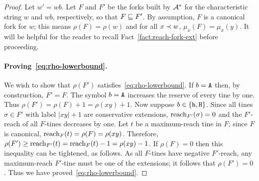 \begin{proof}  
  Let $w' = wb$.
  Let $F$ and $F'$ be the forks built by $\mathcal{A}^*$ 
  for the characteristic string $w$ and $wb$, respectively, 
  so that $F \sqsubseteq F'$.
  By assumption, $F$ is a canonical fork for $w$; 
  this means $\rho(F) = \rho(w)$ and
  for all $x \prec w$, $\mu_x(F) = \mu_x(y)$. 
  It will be helpful for the reader to recall Fact~\ref{fact:reach-fork-ext} before proceeding.


  \paragraph{Proving~\eqref{eq:rho-lowerbound}.} 
  We wish to show that 
  $\rho(F')$ satisfies~\eqref{eq:rho-lowerbound}. 
  If $b = \mathtt{A}$ then, by construction,
  $F' = F$. 
  The symbol $b = \mathtt{A}$ increases the reserve 
  of every tine by one. 
  Thus  
  $
  \rho(F') 
  = \rho(F) + 1
  = \rho(xy)  + 1
  $. 
  Now suppose $b \in \{\mathtt{h}, \mathtt{H}\}$. 
  Since all tines $\sigma \in F'$ with label $|xy| + 1$ 
  are conservative extensions, $\operatorname{reach}_{F'}(\sigma) = 0$ 
  and the $F'$-reach of all $F$-tines decreases by one. 
  Let $t$ be a maximum-reach tine in $F$; 
  since $F$ is canonical, $\operatorname{reach}_F(t) = \rho(F) = \rho(xy)$.
  Therefore, 
  $\rho(F') \geq \operatorname{reach}_{F'}(t) = \operatorname{reach}_{F}(t) - 1 = \rho(xy) - 1$. 
  If $\rho(F) = 0$ then this inequality can be tightened, as follows. 
  As all $F$-tines have negative $F'$-reach, 
  any maximum-reach $F'$-tine 
  must be one of the extensions; 
  it follows that $\rho(F') = 0$. 
  Thus we have proved~\eqref{eq:rho-lowerbound}. 




\end{proof}
